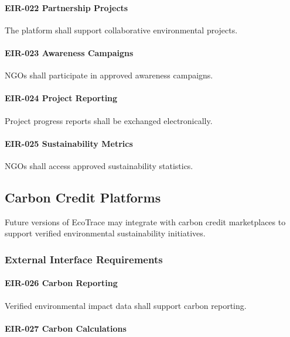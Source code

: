 \paragraph{EIR-022 Partnership Projects}

The platform shall support collaborative environmental projects.

\paragraph{EIR-023 Awareness Campaigns}

NGOs shall participate in approved awareness campaigns.

\paragraph{EIR-024 Project Reporting}

Project progress reports shall be exchanged electronically.

\paragraph{EIR-025 Sustainability Metrics}

NGOs shall access approved sustainability statistics.


\subsection{Carbon Credit Platforms}

Future versions of EcoTrace may integrate with carbon credit
marketplaces to support verified environmental sustainability
initiatives.


\subsubsection*{External Interface Requirements}

\paragraph{EIR-026 Carbon Reporting}

Verified environmental impact data shall support carbon reporting.

\paragraph{EIR-027 Carbon Calculations}

